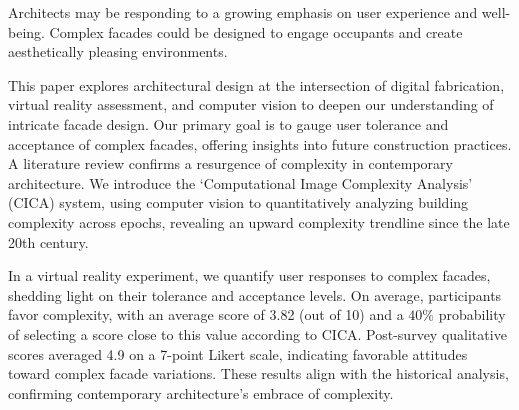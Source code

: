 

 Architects may be responding to a growing emphasis on user experience and well-being.
 Complex facades could be designed to engage occupants and create aesthetically pleasing environments.

This paper explores architectural design at the intersection of digital fabrication, virtual reality assessment, and computer vision to deepen our understanding of intricate facade design.
Our primary goal is to gauge user tolerance and acceptance of complex facades, offering insights into future construction practices.
A literature review confirms a resurgence of complexity in contemporary architecture.
We introduce the `Computational Image Complexity Analysis' (CICA) system, using computer vision to quantitatively analyzing building complexity across epochs, revealing an upward complexity trendline since the late 20th century.

In a virtual reality experiment, we quantify user responses to complex facades, shedding light on their tolerance and acceptance levels.
On average, participants favor complexity, with an average score of 3.82 (out of 10) and a \(40\%\) probability of selecting a score close to this value according to CICA.
Post-survey qualitative scores averaged 4.9 on a 7-point Likert scale, indicating favorable attitudes toward complex facade variations.
These results align with the historical analysis, confirming contemporary architecture's embrace of complexity.



